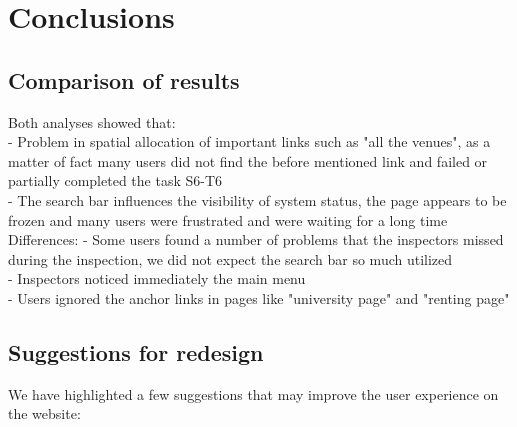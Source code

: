 
\section{Conclusions}
\subsection{Comparison of results}
Both analyses showed that:\\
- Problem in spatial allocation of important links such as "all the venues", as a matter of fact many users did not find the before mentioned link and failed or partially completed the task S6-T6\\
- The search bar influences the visibility of system status, the page appears to be frozen and many users were frustrated and were waiting for a long time\\

Differences:
- Some users found a number of problems that the inspectors missed during the inspection, we did not expect the search bar so much utilized\\
- Inspectors noticed immediately the main menu\\
- Users ignored the anchor links in pages like "university page" and "renting page"
\subsection{Suggestions for redesign}

We have highlighted a few suggestions that may improve the user experience on the website:

